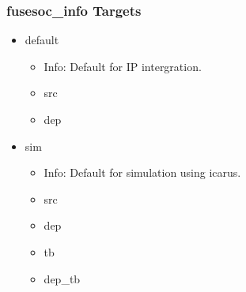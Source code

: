 \subsubsection{fusesoc\_info Targets}
\begin{itemize}
\item default
	\begin{itemize}
	\item[$\space$] Info: Default for IP intergration.
	\item src
	\item dep
	\end{itemize}
\item sim
	\begin{itemize}
	\item[$\space$] Info: Default for simulation using icarus.
	\item src
	\item dep
	\item tb
	\item dep\_tb
	\end{itemize}
\end{itemize}
